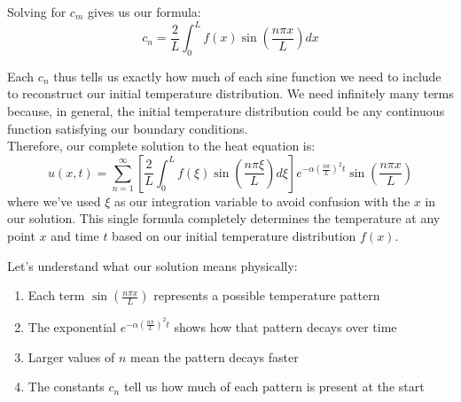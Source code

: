 \noindent Solving for $c_m$ gives us our formula:
\[
c_n = \frac{2}{L}\int_0^L f(x)\sin\left(\frac{n\pi x}{L}\right)dx
\]

\noindent Each $c_n$ thus tells us exactly how much of each sine function we need to include to reconstruct our initial temperature distribution. We need infinitely many terms because, in general, the initial temperature distribution could be any continuous function satisfying our boundary conditions. \\

\noindent Therefore, our complete solution to the heat equation is:
\[
u(x,t) = \sum_{n=1}^{\infty} \left[\frac{2}{L}\int_0^L f(\xi)\sin\left(\frac{n\pi \xi}{L}\right)d\xi\right] e^{-\alpha(\frac{n\pi}{L})^2 t}\sin\left(\frac{n\pi x}{L}\right)
\]
where we've used $\xi$ as our integration variable to avoid confusion with the $x$ in our solution. This single formula completely determines the temperature at any point $x$ and time $t$ based on our initial temperature distribution $f(x)$.

\noindent Let's understand what our solution means physically:
\begin{enumerate}
   \item Each term $\sin(\frac{n\pi x}{L})$ represents a possible temperature pattern
   \item The exponential $e^{-\alpha(\frac{n\pi}{L})^2 t}$ shows how that pattern decays over time
   \item Larger values of $n$ mean the pattern decays faster
   \item The constants $c_n$ tell us how much of each pattern is present at the start
\end{enumerate}


